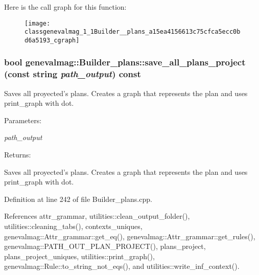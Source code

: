 Here is the call graph for this function:\nopagebreak
\begin{figure}[H]
\begin{center}
\leavevmode
\texttt{[image: classgenevalmag\_1\_1Builder\_\_plans\_a15ea4156613c75cfca5ecc0bd6a5193\_cgraph]}
\end{center}
\end{figure}
\hypertarget{classgenevalmag_1_1Builder__plans_7017816e03c141df9dbdb55f3f8f896c}{
\subsubsection[{save\_\-all\_\-plans\_\-project}]{\setlength{\rightskip}{0pt plus 5cm}bool genevalmag::Builder\_\-plans::save\_\-all\_\-plans\_\-project (const string {\em path\_\-output}) const}}
\label{classgenevalmag_1_1Builder__plans_7017816e03c141df9dbdb55f3f8f896c}


Saves all proyected's plans. Creates a graph that represents the plan and uses print\_\-graph with dot. \begin{Desc}
\item[Parameters:]
\begin{description}
\item[{\em path\_\-output}]\end{description}
\end{Desc}
\begin{Desc}
\item[Returns:]\end{Desc}
Saves all proyected's plans. Creates a graph that represents the plan and uses print\_\-graph with dot. 

Definition at line 242 of file Builder\_\-plans.cpp.

References attr\_\-grammar, utilities::clean\_\-output\_\-folder(), utilities::cleaning\_\-tabs(), contexts\_\-uniques, genevalmag::Attr\_\-grammar::get\_\-eq(), genevalmag::Attr\_\-grammar::get\_\-rules(), genevalmag::PATH\_\-OUT\_\-PLAN\_\-PROJECT(), plans\_\-project, plans\_\-project\_\-uniques, utilities::print\_\-graph(), genevalmag::Rule::to\_\-string\_\-not\_\-eqs(), and utilities::write\_\-inf\_\-context().


